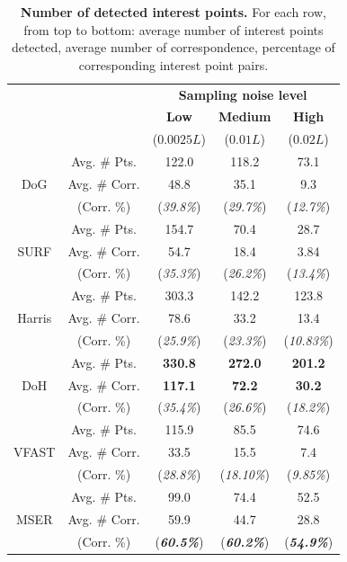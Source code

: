 \begin{table}[ht]
	\centering
	\begin{tabular}{|cc|ccc|}
\hline
& & \multicolumn{3}{c}{\textbf{Sampling noise level}}  \\
& &  {\textbf{Low}}  & {\textbf{Medium}}  & {\textbf{High}}  \\
& & ($0.0025L$) & ($0.01L$) & ($0.02L$) \\
\hline
\hline
\multirow{3}{*}{DoG}  & Avg. \# Pts. &   122.0 & 118.2 & 73.1 \\
& Avg. \# Corr. &  48.8 & 35.1 &  9.3 \\
& (Corr. \%) & (\textit{39.8\%}) & (\textit{29.7\%}) & (\textit{12.7\%}) \\
\hline
\multirow{3}{*}{SURF} & Avg. \# Pts. & 154.7 & 70.4  & 28.7 \\
& Avg. \# Corr. &  54.7 & 18.4  & 3.84 \\
& (Corr. \%) &  (\textit{35.3\%}) & (\textit{26.2\%})  & (\textit{13.4\%}) \\
\hline
\multirow{3}{*}{Harris} & Avg. \# Pts. & 303.3 & 142.2 &  123.8 \\
& Avg. \# Corr. & 78.6  & 33.2  &    13.4  \\
& (Corr. \%) & (\textit{25.9\%}) & (\textit{23.3\%}) & (\textit{10.83\%}) \\
\hline
\multirow{3}{*}{DoH}& Avg. \# Pts. &  {\textbf{\color{blue}330.8}} & {\textbf{\color{blue}272.0}} &   {\textbf{\color{blue}201.2}} \\
& Avg. \# Corr. & {\textbf{\color{blue}117.1}} & {\textbf{\color{blue}72.2}}  &   {\textbf{\color{blue}30.2}} \\
& (Corr. \%) & (\textit{35.4\%}) & (\textit{26.6\%}) & (\textit{18.2\%}) \\
\hline
\multirow{3}{*}{VFAST}& Avg. \# Pts. &  115.9 &  85.5  &  74.6\\ 
& Avg. \# Corr. & 33.5  & 15.5  &    7.4 \\
& (Corr. \%) & (\textit{28.8\%}) & (\textit{18.10\%})  & (\textit{9.85\%}) \\
\hline
\multirow{3}{*}{MSER}& Avg. \# Pts.  &  99.0  & 74.4  &   52.5 \\
& Avg. \# Corr. & 59.9 & 44.7  &   28.8 \\
& (Corr. \%) & ({\textit{\textbf{\color{blue}60.5\%}}})  & ({\textit{\textbf{\color{blue}60.2\%}}})  & ({\textit{\textbf{\color{blue}54.9\%}}})\\
\hline
\end{tabular}
\caption{\textbf{Number of detected interest points.} For each row, from top to bottom: average number of interest points detected, average number of correspondence, percentage of corresponding interest point pairs.}
\label{tab/eval/numcorr}
\end{table}


